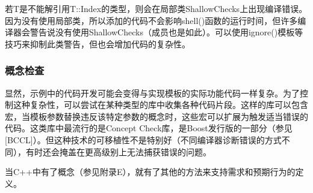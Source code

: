 若T是不能解引用T::Index的类型，则会在局部类ShallowChecks上出现编译错误。因为没有使用局部类，所以添加的代码不会影响shell()函数的运行时间，但许多编译器会警告说没有使用ShallowChecks（成员也是如此）。可以使用ignore()模板等技巧来抑制此类警告，但也会增加代码的复杂性。

\subsubsection{概念检查}

显然，示例中的代码开发可能会变得与实现模板的实际功能代码一样复杂。为了控制这种复杂性，可以尝试在某种类型的库中收集各种代码片段。这样的库可以包含宏，当模板参数替换违反该特定参数的概念时，这些宏可以扩展为触发适当错误的代码。这类库中最流行的是Concept Check库，是Boost发行版的一部分（参见[BCCL]）。但这种技术的可移植性不是特别好（不同编译器诊断错误的方式不同），有时还会掩盖在更高级别上无法捕获错误的问题。

当C++中有了概念（参见附录E），就有了其他的方法来支持需求和预期行为的定义。































